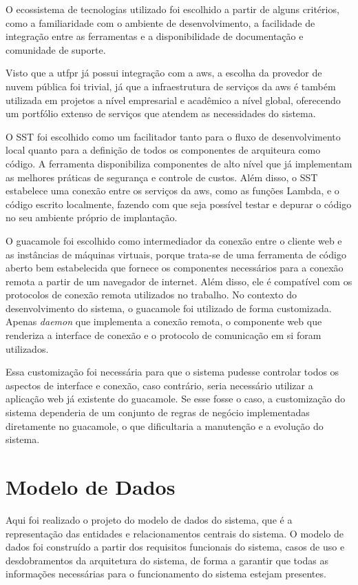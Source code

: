 O ecossistema de tecnologias utilizado foi escolhido a partir de alguns critérios, como a familiaridade com o ambiente de desenvolvimento, a facilidade de integração entre as ferramentas e a disponibilidade de documentação e comunidade de suporte.

Visto que a \gls{utfpr} já possui integração com a \gls{aws}, a escolha da provedor de nuvem pública foi trivial, já que a infraestrutura de serviços da \gls{aws} é também utilizada em projetos a nível empresarial e acadêmico a nível global, oferecendo um portfólio extenso de serviços que atendem as necessidades do sistema.

O SST foi escolhido como um facilitador tanto para o fluxo de desenvolvimento local quanto para a definição de todos os componentes de arquiteura como código. A ferramenta disponibiliza componentes de alto nível que já implementam as melhores práticas de segurança e controle de custos. Além disso, o SST estabelece uma conexão entre os serviços da \gls{aws}, como as funções Lambda, e o código escrito localmente, fazendo com que seja possível testar e depurar o código no seu ambiente próprio de implantação.

O \gls{guacamole} foi escolhido como intermediador da conexão entre o cliente web e as instâncias de máquinas virtuais, porque trata-se de uma ferramenta de código aberto bem estabelecida que fornece os componentes necessários para a conexão remota a partir de um navegador de internet. Além disso, ele é compatível com os protocolos de conexão remota utilizados no trabalho. No contexto do desenvolvimento do sistema, o \gls{guacamole} foi utilizado de forma customizada. Apenas \textit{daemon} que implementa a conexão remota, o componente web que renderiza a interface de conexão e o protocolo de comunicação em si foram utilizados.

Essa customização foi necessária para que o sistema pudesse controlar todos os aspectos de interface e conexão, caso contrário, seria necessário utilizar a aplicação web já existente do \gls{guacamole}. Se esse fosse o caso, a customização do sistema dependeria de um conjunto de regras de negócio implementadas diretamente no \gls{guacamole}, o que dificultaria a manutenção e a evolução do sistema.

\section{Modelo de Dados}
\label{sec:modeloDeDados}

Aqui foi realizado o projeto do modelo de dados do sistema, que é a representação das entidades e relacionamentos centrais do sistema. O modelo de dados foi construído a partir dos requisitos funcionais do sistema, casos de uso e desdobramentos da arquitetura do sistema, de forma a garantir que todas as informações necessárias para o funcionamento do sistema estejam presentes. 

